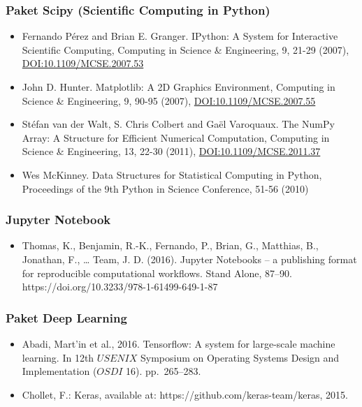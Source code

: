 \documentclass[11pt]{article}
\providecommand{\tightlist}{%
      \setlength{\itemsep}{0pt}\setlength{\parskip}{0pt}}
\begin{document}
\hypertarget{paket-scipy-scientific-computing-in-python}{%
\subsubsection{Paket Scipy (Scientific Computing in
Python)}\label{paket-scipy-scientific-computing-in-python}}

\begin{itemize}
\tightlist
\item
  Fernando Pérez and Brian E. Granger. IPython: A System for Interactive
  Scientific Computing, Computing in Science \& Engineering, 9, 21-29
  (2007),
  \href{https://doi.org/10.1109/MCSE.2007.53}{DOI:10.1109/MCSE.2007.53}
\item
  John D. Hunter. Matplotlib: A 2D Graphics Environment, Computing in
  Science \& Engineering, 9, 90-95 (2007),
  \href{https://doi.org/10.1109/MCSE.2007.55}{DOI:10.1109/MCSE.2007.55}
\item
  Stéfan van der Walt, S. Chris Colbert and Gaël Varoquaux. The NumPy
  Array: A Structure for Efficient Numerical Computation, Computing in
  Science \& Engineering, 13, 22-30 (2011),
  \href{http://dx.doi.org/10.1109/MCSE.2011.37}{DOI:10.1109/MCSE.2011.37}
\item
  Wes McKinney. Data Structures for Statistical Computing in Python,
  Proceedings of the 9th Python in Science Conference, 51-56 (2010)
\end{itemize}

\hypertarget{jupyter-notebook}{%
\subsubsection{Jupyter Notebook}\label{jupyter-notebook}}

\begin{itemize}
\tightlist
\item
  Thomas, K., Benjamin, R.-K., Fernando, P., Brian, G., Matthias, B.,
  Jonathan, F., \ldots{} Team, J. D. (2016). Jupyter Notebooks -- a
  publishing format for reproducible computational workflows. Stand
  Alone, 87--90. https://doi.org/10.3233/978-1-61499-649-1-87
\end{itemize}

\hypertarget{paket-deep-learning}{%
\subsubsection{Paket Deep Learning}\label{paket-deep-learning}}

\begin{itemize}
\tightlist
\item
  Abadi, Mart'in et al., 2016. Tensorflow: A system for large-scale
  machine learning. In 12th \(USENIX\) Symposium on Operating Systems
  Design and Implementation (\(OSDI\) 16). pp.~265--283.
\item
  Chollet, F.: Keras, available at: https://github.com/keras-team/keras,
  2015.
\end{itemize}
\end{document}
